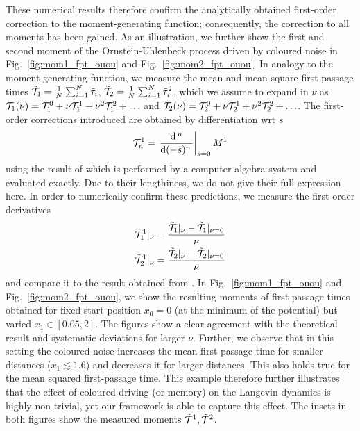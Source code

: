 \documentclass[%
 reprint,
superscriptaddress,
nofootinbib,
 amsmath,amssymb,
 aps,
prx,
]{revtex4-2}
\begin{document}
These numerical results therefore confirm the analytically obtained first-order correction to the moment-generating function; consequently, the correction to all moments has been gained. As an illustration, we further show the first and second moment of the Ornstein-Uhlenbeck process driven by coloured noise in Fig.~\ref{fig:mom1_fpt_ouou} and Fig.~\ref{fig:mom2_fpt_ouou}. In analogy to the moment-generating function, we measure the mean and mean square first passage times $\tilde{\mathcal{T}}_1 = \frac{1}{N}\sum_{i=1}^N \tilde\tau_i$, $\tilde{\mathcal{T}}_2 = \frac{1}{N}\sum_{i=1}^N \tilde\tau_i^2$, which we assume to expand in $\nu$ as $\mathcal{T}_1(\nu) = \mathcal{T}^0_1 + \nu \mathcal{T}_1^1 + \nu^2 \mathcal{T}^2_1 + \ldots $ and $\mathcal{T}_2(\nu) = \mathcal{T}^0_2 + \nu \mathcal{T}^1_2 + \nu^2 \mathcal{T}_2^2 + \ldots $. The first-order corrections introduced are obtained by differentiation wrt $\bar{s}$
\begin{align}
    \mathcal{T}^1_n =\left.\frac{\mathrm{d}{}\, ^n}{\mathrm{d}{(-\bar{s})^n}\,}\right|_{\bar{s}=0} M^1
    \label{eq:how_to_t_scaling}
\end{align}
using the result of 
which is performed by a computer algebra system and evaluated exactly. Due to their lengthiness, we do not give their full expression here. In order to numerically confirm these predictions, we measure the first order derivatives
\begin{align}
    \label{eq:def_cT1_ouou}
    \tilde{\mathcal{T}}^1_1|_{\nu} &= \frac{\tilde{\mathcal{T}}_1|_{\nu}  -\tilde{\mathcal{T}}_1|_{\nu=0} }{\nu} \\
    \tilde{\mathcal{T}}^1_2|_{\nu} &= \frac{\tilde{\mathcal{T}}_2|_{\nu}  -\tilde{\mathcal{T}}_2|_{\nu=0} }{\nu}
    \label{eq:def_cT2_ouou}
\end{align}
and compare it to the result obtained from .
In Fig.~\ref{fig:mom1_fpt_ouou} and Fig.~\ref{fig:mom2_fpt_ouou}, we show the resulting moments of first-passage times obtained for fixed start position $x_0 = 0$ (at the minimum of the potential) but varied $x_1 \in [0.05,2]$. The figures show a clear agreement with the theoretical result and systematic deviations for larger $\nu$. Further, we observe that in this setting the coloured noise increases the mean-first passage time for smaller distances ($x_1 \lesssim 1.6$) and decreases it for larger distances. This also holds true for the mean squared first-passage time. This example therefore further illustrates that the effect of coloured driving (or memory) on the Langevin dynamics is highly non-trivial, yet our framework is able to capture this effect. The insets in both figures show the measured moments $\tilde{\mathcal{T}}^1,\tilde{\mathcal{T}}^2$.
\end{document}
